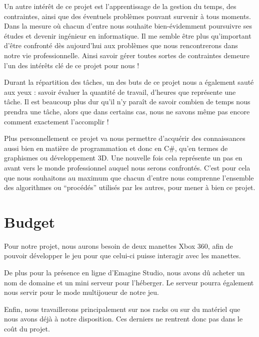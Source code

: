 \documentclass[a4paper, 11pt]{report}
\begin{document}
Un autre intérêt de ce projet est l'apprentissage de la gestion du temps, des contraintes, ainsi que des éventuels problèmes pouvant survenir à tous moments. Dans la mesure où chacun d'entre nous souhaite bien-évidemment poursuivre ses études et devenir ingénieur en informatique. Il me semble être plus qu'important d'être confronté dès aujourd'hui aux problèmes que nous rencontrerons dans notre vie professionnelle. Ainsi savoir gérer toutes sortes de contraintes demeure l'un des intérêts clé de ce projet pour nous !

Durant la répartition des tâches, un des buts de ce projet nous a également sauté aux yeux : savoir évaluer la quantité de travail, d'heures que représente une tâche. Il est beaucoup plus dur qu'il n'y paraît de savoir combien de temps nous prendra une tâche, alors que dans certains cas, nous ne savons même pas encore comment exactement l'accomplir !

Plus personnellement ce projet va nous permettre d'acquérir des connaissances aussi bien en matière de programmation et donc en C\#, qu'en termes de graphismes ou développement 3D. Une nouvelle fois cela représente un pas en avant vers le monde professionnel auquel nous serons confrontés. C'est pour cela que nous souhaitons au maximum que chacun d'entre nous comprenne l'ensemble des algorithmes ou ``procédés'' utilisés par les autres, pour mener à bien ce projet.

\newpage
\section{Budget}\label{budget}

Pour notre projet, nous aurons besoin de deux manettes Xbox 360, afin de pouvoir développer le jeu pour que celui-ci puisse interagir avec les manettes.

De plus pour la présence en ligne d'Emagine Studio, nous avons dû acheter un nom de domaine et un mini serveur pour l'héberger. Le serveur pourra également nous servir pour le mode multijoueur de notre jeu.

Enfin, nous travaillerons principalement sur nos racks ou sur du matériel que nous avons déjà à notre disposition. Ces derniers ne rentrent donc pas dans le coût du projet.
\newline
\end{document}
